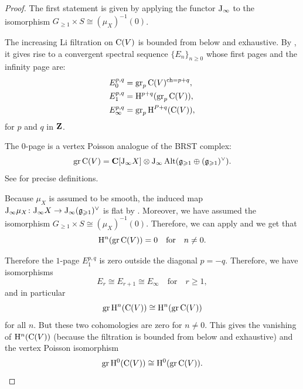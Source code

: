\begin{proof}
	The first statement is given by applying the functor $\mathrm{J}_\infty$ to the isomorphism $G_{\geqslant 1} \times S \cong (\mu_X)^{-1}(0)$.
	
	The increasing Li filtration on $\mathrm{C}(V)$ is bounded from below and exhaustive. By \cite[Theorem 5.5.1]{weibel1994introduction}, it gives rise to a convergent spectral sequence $\{E_n\}_{n \geqslant 0}$ whose first pages and the infinity page are:
	\[ \begin{aligned}
		E_0^{p, q} & = \operatorname{gr}_p \mathrm{C}(V)^{\mathrm{ch} = p + q}, \\
		E_1^{p, q} & = \mathrm{H}^{p + q}(\operatorname{gr}_p \mathrm{C}(V)), \\
		E_\infty^{p, q} & = \operatorname{gr}_p \mathrm{H}^{P + q}(\mathrm{C}(V)),
	\end{aligned} \]
	for $p$ and $q$ in $\mathbf{Z}$.
	
	The $0$-page is a vertex Poisson analogue of the BRST complex:
	\[ \operatorname{gr} \mathrm{C}(V) = \mathbf{C}[\mathrm{J}_\infty X] \otimes \mathrm{J}_\infty \operatorname{Alt}(\mathfrak g_{\geqslant 1} \oplus (\mathfrak g_{\geqslant 1})^\vee). \]
	See \cite[Section 2.3.3]{arakawa2015localization} for precise definitions.
	
	Because $\mu_X$ is assumed to be smooth, the induced map $\mathrm{J}_\infty \mu_X \colon \mathrm{J}_\infty X \rightarrow \mathrm{J}_\infty (\mathfrak g_{\geqslant 1})^\vee$ is flat by \cite[Remark 3.4.2]{genra2025reduction}. Moreover, we have assumed the isomorphism $G_{\geqslant 1} \times S \cong (\mu_X)^{-1}(0)$. Therefore, we can apply \cite[Theorem 2.3.3.1]{arakawa2015localization} and we get that
	\[ \mathrm{H}^{n}(\operatorname{gr}\mathrm{C}(V)) = 0 \quad \text{for} \quad n \neq 0. \]
	
	Therefore the $1$-page $E_1^{p, q}$ is zero outside the diagonal $p = - q$. Therefore, we have isomorphisms
	\[ E_r \cong E_{r+1} \cong E_\infty \quad \text{for} \quad r \geqslant 1, \]
	and in particular
	\[ \operatorname{gr} \mathrm{H}^n(\mathrm{C}(V)) \cong  \mathrm{H}^n(\operatorname{gr} \mathrm{C}(V)) \]
	for all $n$. But these two cohomologies are zero for $n \neq 0$. This gives the vanishing of $\mathrm{H}^n(\mathrm{C}(V))$ (because the filtration is bounded from below and exhaustive) and the vertex Poisson isomorphism
	\[ \operatorname{gr} \mathrm{H}^0(\mathrm{C}(V)) \cong \mathrm{H}^0(\operatorname{gr} \mathrm{C}(V)). \]
\end{proof}
